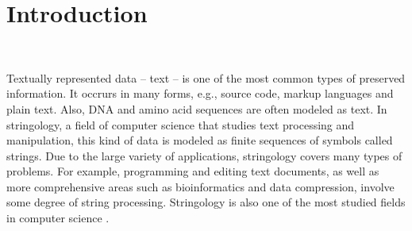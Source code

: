 \documentclass[english,twoside,censored,csm,algorithms-track-2020]{HYthesisML}
\theoremstyle{plain}
\theoremstyle{definition}
\begin{document}
\mainmatter


%
%
%
%



\chapter{Introduction}~\label{chp-intro}


Textually represented data -- text -- is one of the most common types of preserved information.
It occrurs in many forms, e.g., source code, markup languages and plain text.
Also, DNA and amino acid sequences are often modeled as text.
In stringology, a field of computer science that studies text processing and manipulation,
this kind of data is modeled as finite sequences of symbols called strings.
Due to the large variety of applications, stringology covers many types of problems.
For example, programming and editing text documents, as well as more comprehensive areas such as
bioinformatics and data compression, involve some degree of string processing.
Stringology is also one of the most studied fields in computer science \citep{Crochemore03}.
\end{document}
